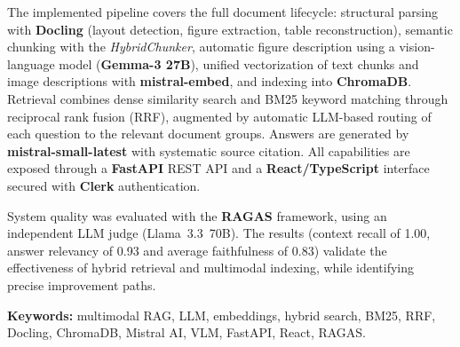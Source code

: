 The implemented pipeline covers the full document lifecycle: structural parsing with
\textbf{Docling} (layout detection, figure extraction, table reconstruction), semantic
chunking with the \emph{HybridChunker}, automatic figure description using a
vision-language model (\textbf{Gemma-3 27B}), unified vectorization of text chunks and
image descriptions with \textbf{mistral-embed}, and indexing into \textbf{ChromaDB}.
Retrieval combines dense similarity search and BM25 keyword matching through reciprocal
rank fusion (RRF), augmented by automatic LLM-based routing of each question to the
relevant document groups. Answers are generated by \textbf{mistral-small-latest} with
systematic source citation. All capabilities are exposed through a \textbf{FastAPI} REST
API and a \textbf{React/TypeScript} interface secured with \textbf{Clerk} authentication.

System quality was evaluated with the \textbf{RAGAS} framework, using an independent LLM
judge (Llama~3.3~70B). The results (context recall of 1.00, answer relevancy of 0.93 and
average faithfulness of 0.83) validate the effectiveness of hybrid retrieval and
multimodal indexing, while identifying precise improvement paths.

\vspace{3mm}
\noindent\textbf{Keywords:} multimodal RAG, LLM, embeddings, hybrid search, BM25, RRF,
Docling, ChromaDB, Mistral AI, VLM, FastAPI, React, RAGAS.
